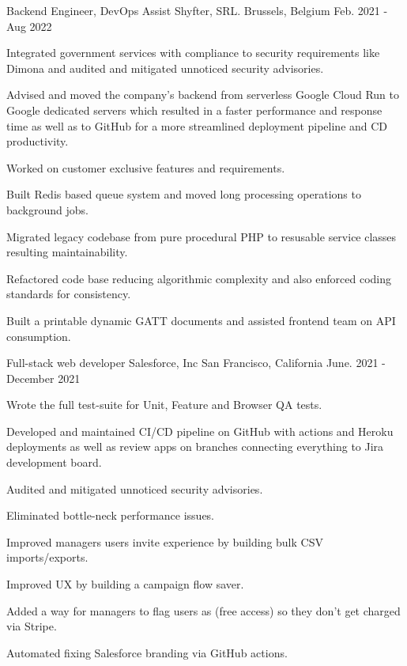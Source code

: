 \begin{cventries}
  \cventry
    {Backend Engineer, DevOps Assist} %
    {Shyfter, SRL.} %
    {Brussels, Belgium} %
    {Feb. 2021 - Aug 2022} %
    {
      \begin{cvitems} %
        \item {Integrated government services with compliance to security requirements like Dimona and audited and mitigated unnoticed security advisories.}
        \item {Advised and moved the company's backend from serverless Google Cloud Run to Google dedicated servers which resulted in a faster performance and response time as well as to GitHub for a more streamlined deployment pipeline and CD productivity.}
        \item {Worked on customer exclusive features and requirements.}
        \item {Built Redis based queue system and moved long processing operations to background jobs.}
        \item {Migrated legacy codebase from pure procedural PHP to resusable service classes resulting maintainability.}
        \item {Refactored code base reducing algorithmic complexity and also enforced coding standards for consistency.}
        \item {Built a printable dynamic GATT documents and assisted frontend team on API consumption.}
      \end{cvitems}
    }

  \cventry
    {Full-stack web developer} %
    {Salesforce, Inc} %
    {San Francisco, California} %
    {June. 2021 - December 2021} %
    {
      \begin{cvitems} %
        \item {Wrote the full test-suite for Unit, Feature and Browser QA tests.}
        \item {Developed and maintained CI/CD pipeline on GitHub with actions and Heroku deployments as well as review apps on branches connecting everything to Jira development board.}
        \item {Audited and mitigated unnoticed security advisories.}
        \item {Eliminated bottle-neck performance issues.}
        \item {Improved managers users invite experience by building bulk CSV imports/exports.}
        \item {Improved UX by building a campaign flow saver.}
        \item {Added a way for managers to flag users as (free access) so they don't get charged via Stripe.}
        \item {Automated fixing Salesforce branding via GitHub actions.}
      \end{cvitems}
     }


\end{cventries}

